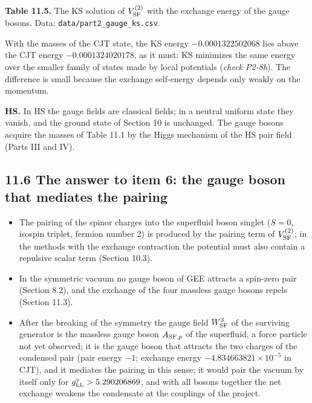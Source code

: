 \documentclass[
  10pt,
]{article}
\providecommand{\tightlist}{%
  \setlength{\itemsep}{0pt}\setlength{\parskip}{0pt}}
\begin{document}
\textbf{Table 11.5.} The KS solution of \(V^{(2)}_{\rm SF}\) with the
exchange energy of the gauge bosons. Data:
\texttt{data/part2\_gauge\_ks.csv}.

With the masses of the CJT state, the KS energy \(-0.0001322502068\)
lies above the CJT energy \(-0.0001324020178\), as it must: KS minimizes
the same energy over the smaller family of states made by local
potentials (\emph{check P2-8h}). The difference is small because the
exchange self-energy depends only weakly on the momentum.

\textbf{HS.} In HS the gauge fields are classical fields; in a neutral
uniform state they vanish, and the ground state of Section 10 is
unchanged. The gauge bosons acquire the masses of Table 11.1 by the
Higgs mechanism of the HS pair field (Parts III and IV).

\hypertarget{the-answer-to-item-6-the-gauge-boson-that-mediates-the-pairing}{%
\subsection{11.6 The answer to item 6: the gauge boson that mediates the
pairing}\label{the-answer-to-item-6-the-gauge-boson-that-mediates-the-pairing}}

\begin{itemize}
\tightlist
\item
  The pairing of the spinor charges into the superfluid boson singlet
  (\(S=0\), isospin triplet, fermion number 2) is produced by the
  pairing term of \(V^{(2)}_{\rm SF}\); in the methods with the exchange
  contraction the potential must also contain a repulsive scalar term
  (Section 10.3).
\item
  In the symmetric vacuum no gauge boson of GEE attracts a spin-zero
  pair (Section 8.2), and the exchange of the four massless gauge bosons
  repels (Section 11.3).
\item
  After the breaking of the symmetry the gauge field \(W^3_{\rm SF}\) of
  the surviving generator is the massless gauge boson \(A_{{\rm SF},p}\)
  of the superfluid, a force particle not yet observed; it is the gauge
  boson that attracts the two charges of the condensed pair (pair energy
  \(-1\); exchange energy \(-4.834663821\times10^{-5}\) in CJT), and it
  mediates the pairing in this sense; it would pair the vacuum by itself
  only for \(g^{\rm v}_{\rm LL}>5.290206869\), and with all bosons
  together the net exchange weakens the condensate at the couplings of
  the project.
\end{itemize}
\end{document}
